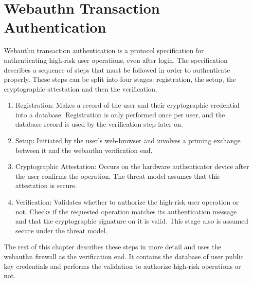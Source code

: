 \chapter{Webauthn Transaction Authentication}\label{Chap:WebauthnTransactionAuthentication}

Webauthn transaction authentication is a protocol specification for authenticating high-risk user operations, even after login. The specification describes a sequence of steps that must be followed in order to authenticate properly. These steps can be split into four stages: registration, the setup, the cryptographic attestation and then the verification. 


\begin{enumerate}[nosep]
\item Registration: Makes a record of the user and their cryptographic credential into a database. Registration is only performed once per user, and the database record is used by the verification step later on.

\item Setup: Initiated by the user's web-browser and involves a priming exchange between it and the webauthn verification end.

\item Cryptographic Attestation: Occurs on the hardware authenticator device after the user confirms the operation. The threat model assumes that this attestation is secure.

\item Verification: Validates whether to authorize the high-risk user operation or not. Checks if the requested operation matches its authentication message and that the cryptographic signature on it is valid. This stage also is assumed secure under the threat model.

\end{enumerate}

The rest of this chapter describes these steps in more detail and uses the webauthn firewall as the verification end. It contains the database of user public key credentials and performs the validation to authorize high-risk operations or not. 

